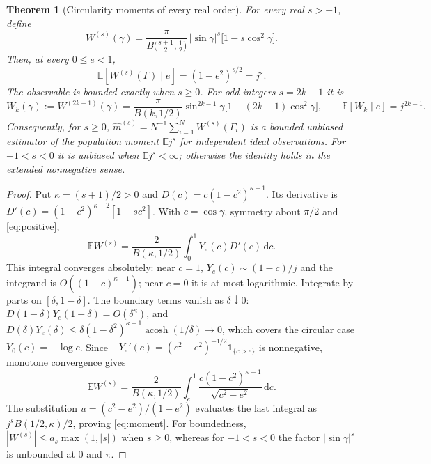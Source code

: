 \documentclass[11pt,a4paper]{article}
\newtheorem{theorem}{Theorem}[section]
\theoremstyle{remark}\newtheorem{remark}[theorem]{Remark}
\DeclareMathOperator{\acosh}{acosh}
\newcommand{\E}{\mathbb E}
\newcommand{\ind}{\mathbf 1}
\newcommand{\dd}{\,\mathrm d}
\begin{document}
\begin{theorem}[Circularity moments of every real order]\label{thm:moments}
For every real $s>-1$, define
\begin{equation}\label{eq:Ws}
W^{(s)}(\gamma)=\frac{\pi}{B\big(\tfrac{s+1}{2},\tfrac12\big)}\,|\sin\gamma|^{s}
\big[1-s\cos^2\gamma\big].
\end{equation}
Then, at every $0\le e<1$,
\begin{equation}\label{eq:moment}
\E[W^{(s)}(\Gamma)\mid e]=(1-e^2)^{s/2}=j^{s}.
\end{equation}
The observable is bounded exactly when $s\ge0$. For odd integers $s=2k-1$ it is
\begin{equation}\label{eq:W}
W_k(\gamma):=W^{(2k-1)}(\gamma)=\frac{\pi}{B(k,1/2)}\sin^{2k-1}\gamma
\big[1-(2k-1)\cos^2\gamma\big],\qquad \E[W_k\mid e]=j^{2k-1}.
\end{equation}
Consequently, for $s\ge0$, $\widehat m^{(s)}=N^{-1}\sum_{i=1}^N W^{(s)}(\Gamma_i)$ is a bounded unbiased estimator of the population moment $\E j^s$ for independent ideal observations. For $-1<s<0$ it is unbiased when $\E j^s<\infty$; otherwise the identity holds in the extended nonnegative sense.
\end{theorem}

\begin{proof}
Put $\kappa=(s+1)/2>0$ and $D(c)=c(1-c^2)^{\kappa-1}$. Its derivative is
$D'(c)=(1-c^2)^{\kappa-2}[1-sc^2]$. With $c=\cos\gamma$, symmetry about $\pi/2$ and \eqref{eq:positive},
\begin{equation}
\E W^{(s)}=\frac{2}{B(\kappa,1/2)}\int_0^1Y_e(c)D'(c)\dd c.
\end{equation}
This integral converges absolutely: near $c=1$, $Y_e(c)\sim(1-c)/j$ and the integrand is $O((1-c)^{\kappa-1})$; near $c=0$ it is at most logarithmic. Integrate by parts on $[\delta,1-\delta]$. The boundary terms vanish as $\delta\downarrow0$: $D(1-\delta)Y_e(1-\delta)=O(\delta^{\kappa})$, and $D(\delta)Y_e(\delta)\le\delta(1-\delta^2)^{\kappa-1}\acosh(1/\delta)\to0$, which covers the circular case $Y_0(c)=-\log c$. Since $-Y_e'(c)=(c^2-e^2)^{-1/2}\ind_{\{c>e\}}$ is nonnegative, monotone convergence gives
\begin{equation}
\E W^{(s)}=\frac{2}{B(\kappa,1/2)}\int_e^1
\frac{c(1-c^2)^{\kappa-1}}{\sqrt{c^2-e^2}}\dd c.
\end{equation}
The substitution $u=(c^2-e^2)/(1-e^2)$ evaluates the last integral as
$j^{s}B(1/2,\kappa)/2$, proving \eqref{eq:moment}. For boundedness, $|W^{(s)}|\le a_s\max(1,|s|)$ when $s\ge0$, whereas for $-1<s<0$ the factor $|\sin\gamma|^s$ is unbounded at $0$ and $\pi$.
\end{proof}
\end{document}
